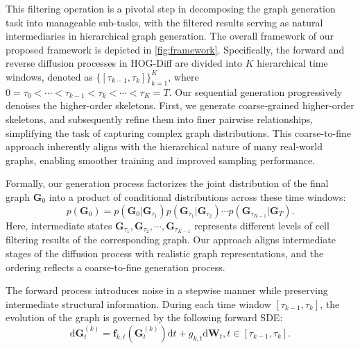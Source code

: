 This filtering operation is a pivotal step in decomposing the graph generation task into manageable sub-tasks, with the filtered results serving as natural intermediaries in hierarchical graph generation. 
The overall framework of our proposed framework is depicted in \cref{fig:framework}.
Specifically, the forward and reverse diffusion processes in HOG-Diff are divided into $K$ hierarchical time windows, denoted as  $\{[\tau_{k-1},\tau_k]\}_{k=1}^K$, where $0 = \tau_0 < \cdots < \tau_{k-1}< \tau_k < \cdots < \tau_K = T$. 
Our sequential generation progressively denoises the higher-order skeletons.  
First, we generate coarse-grained higher-order skeletons, and subsequently refine them into finer pairwise relationships, simplifying the task of capturing complex graph distributions. 
%
This coarse-to-fine approach inherently aligns with the hierarchical nature of many real-world graphs, enabling smoother training and improved sampling performance.



Formally, our generation process factorizes the joint distribution of the final graph $\bm{G}_0$ into a product of conditional distributions across these time windows:
\begin{equation}
p(\bm{G}_0)=p(\bm{G}_0|\bm{G}_{\tau_1})p(\bm{G}_{\tau_1}|\bm{G}_{\tau_2}) \cdots p(\bm{G}_{\tau_{K-1}}|\bm{G}_{T}).
\end{equation}
Here, intermediate states $\bm{G}_{\tau_1}, \bm{G}_{\tau_2}, \cdots, \bm{G}_{\tau_{K-1}}$ represents different levels of cell filtering results of the corresponding graph. 
Our approach aligns intermediate stages of the diffusion process with realistic graph representations, and the ordering reflects a coarse-to-fine generation process.




The forward process introduces noise in a stepwise manner while preserving intermediate structural information. During each time window $[\tau_{k-1}, \tau_k]$, the evolution of the graph is governed by the following forward SDE:
\begin{equation}
\label{eq:HoGD-forward}
\mathrm{d}\bm{G}_t^{(k)}=\mathbf{f}_{k,t}(\bm{G}_t^{(k)})\mathrm{d}t+g_{k,t}\mathrm{d}\bm{W}_t, t \in [\tau_{k-1}, \tau_k].
\end{equation}


